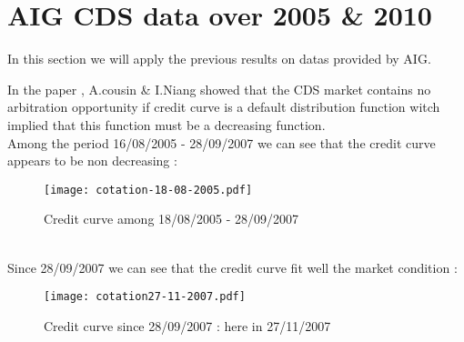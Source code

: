 
\section{AIG CDS data over 2005 \& 2010}
\label{sec:aig-cds-data}

In this section we will apply the previous results on datas provided by AIG.

In the paper \cite{OTRATS}, A.cousin \& I.Niang showed that the CDS market contains
no  arbitration   opportunity  if   credit  curve   is  a   default  distribution
function witch implied that this function must be a decreasing function.\\
Among  the period  16/08/2005 -  28/09/2007  we can  see that  the credit  curve
appears to be non decreasing :

\begin{figure}[H]
  \centering
  \texttt{[image: cotation-18-08-2005.pdf]}
  \caption{Credit curve among 18/08/2005 -  28/09/2007}
\end{figure}
\\
Since 28/09/2007 we can see that the  credit curve fit well the market condition
:


\begin{figure}[H]
  \centering
  \texttt{[image: cotation27-11-2007.pdf]}
  \caption{Credit curve since 28/09/2007 : here in 27/11/2007}
\end{figure}


